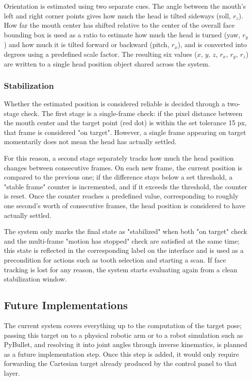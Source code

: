 Orientation is estimated using two separate cues. The angle between the mouth's left and right corner points gives how much the head is tilted sideways (roll, $r_z$). How far the mouth center has shifted relative to the center of the overall face bounding box is used as a ratio to estimate how much the head is turned (yaw, $r_y$) and how much it is tilted forward or backward (pitch, $r_x$), and is converted into degrees using a predefined scale factor. The resulting six values ($x$, $y$, $z$, $r_x$, $r_y$, $r_z$) are written to a single head position object shared across the system.

\subsubsection{Stabilization}
Whether the estimated position is considered reliable is decided through a two-stage check. The first stage is a single-frame check: if the pixel distance between the mouth center and the target point (red dot) is within the set tolerance 15 px, that frame is considered "on target". However, a single frame appearing on target momentarily does not mean the head has actually settled.

For this reason, a second stage separately tracks how much the head position changes between consecutive frames. On each new frame, the current position is compared to the previous one; if the difference stays below a set threshold, a "stable frame" counter is incremented, and if it exceeds the threshold, the counter is reset. Once the counter reaches a predefined value, corresponding to roughly one second's worth of consecutive frames, the head position is considered to have actually settled.

The system only marks the final state as "stabilized" when both "on target" check and the multi-frame "motion has stopped" check are satisfied at the same time; this state is reflected in the corresponding label on the interface and is used as a precondition for actions such as tooth selection and starting a scan. If face tracking is lost for any reason, the system starts evaluating again from a clean stabilization window.

\subsection{Future Implementations}

The current system covers everything up to the computation of the target pose; passing this target on to a physical robotic arm or to a robot simulation such as PyBullet, and resolving it into joint angles through inverse kinematics, is planned as a future implementation step. Once this step is added, it would only require forwarding the Cartesian target already produced by the control panel to that layer.

